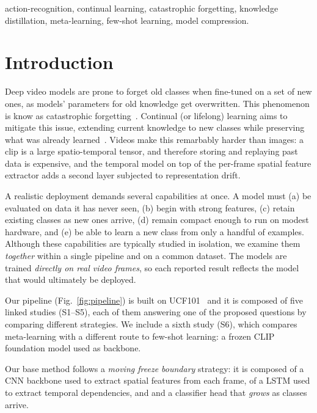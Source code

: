 \documentclass[conference]{IEEEtran}
\begin{document}
\begin{IEEEkeywords}
action-recognition, continual learning, catastrophic forgetting, knowledge
distillation, meta-learning, few-shot learning, model compression.
\end{IEEEkeywords}

\section{Introduction}
Deep video models are prone to forget old classes when fine-tuned on a set of new ones, as models' parameters for old knowledge get overwritten. This phenomenon is know as {catastrophic
forgetting}~\cite{kirkpatrick2017ewc}. 
Continual (or lifelong) learning aims to mitigate this issue, extending current knowledge to new classes while preserving what was already learned~\cite{delange2021survey}. 
Videos make this remarbably harder than images: a clip is a large spatio-temporal tensor, and therefore storing and replaying past data is expensive, and the temporal model on top of the
per-frame spatial feature extractor adds a second layer subjected to representation drift.

A realistic deployment demands several capabilities at once. A model must (a) be
evaluated on data it has never seen, (b) begin with strong features, (c) retain existing
classes as new ones arrive, (d) remain compact enough to run on modest hardware, and (e) be able to learn a new class from only a handful of examples. Although these capabilities are
typically studied in isolation, we examine them \emph{together} within a single pipeline
and on a common dataset. The models are trained \emph{directly on real video frames}, so
each reported result reflects the model that would ultimately be deployed.

Our pipeline (Fig.~\ref{fig:pipeline}) is built on UCF101~\cite{soomro2012ucf101} and it is composed of five
linked studies (S1--S5), each of them answering one of the proposed questions by comparing different strategies. 
We include a sixth study (S6), which compares meta-learning with a
different route to few-shot learning: a frozen CLIP foundation model used as backbone.

Our base method follows a \emph{moving freeze boundary} strategy: it is composed of a CNN backbone used to extract spatial features from each frame, of a LSTM used to extract temporal dependencies, and and a classifier head that \emph{grows} as classes arrive.
\end{document}
